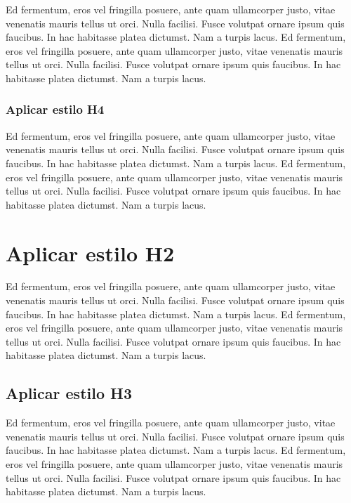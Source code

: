 \documentclass[10.5pt,a4paper]{article}
\begin{document}
Ed fermentum, eros vel fringilla posuere, ante quam ullamcorper justo, vitae venenatis mauris tellus ut orci. Nulla facilisi. Fusce volutpat ornare ipsum quis faucibus. In hac habitasse platea dictumst. Nam a turpis lacus. Ed fermentum, eros vel fringilla posuere, ante quam ullamcorper justo, vitae venenatis mauris tellus ut orci. Nulla facilisi. Fusce volutpat ornare ipsum quis faucibus. In hac habitasse platea dictumst. Nam a turpis lacus.

\subsubsection{Aplicar estilo H4}
 
Ed fermentum, eros vel fringilla posuere, ante quam ullamcorper justo, vitae venenatis mauris tellus ut orci. Nulla facilisi. Fusce volutpat ornare ipsum quis faucibus. In hac habitasse platea dictumst. Nam a turpis lacus. Ed fermentum, eros vel fringilla posuere, ante quam ullamcorper justo, vitae venenatis mauris tellus ut orci. Nulla facilisi. Fusce volutpat ornare ipsum quis faucibus. In hac habitasse platea dictumst. Nam a turpis lacus. 

\section{Aplicar estilo H2}

Ed fermentum, eros vel fringilla posuere, ante quam ullamcorper justo, vitae venenatis mauris tellus ut orci. Nulla facilisi. Fusce volutpat ornare ipsum quis faucibus. In hac habitasse platea dictumst. Nam a turpis lacus. Ed fermentum, eros vel fringilla posuere, ante quam ullamcorper justo, vitae venenatis mauris tellus ut orci. Nulla facilisi. Fusce volutpat ornare ipsum quis faucibus. In hac habitasse platea dictumst. Nam a turpis lacus. 

\subsection{Aplicar estilo H3}

Ed fermentum, eros vel fringilla posuere, ante quam ullamcorper justo, vitae venenatis mauris tellus ut orci. Nulla facilisi. Fusce volutpat ornare ipsum quis faucibus. In hac habitasse platea dictumst. Nam a turpis lacus. Ed fermentum, eros vel fringilla posuere, ante quam ullamcorper justo, vitae venenatis mauris tellus ut orci. Nulla facilisi. Fusce volutpat ornare ipsum quis faucibus. In hac habitasse platea dictumst. Nam a turpis lacus.
\end{document}
